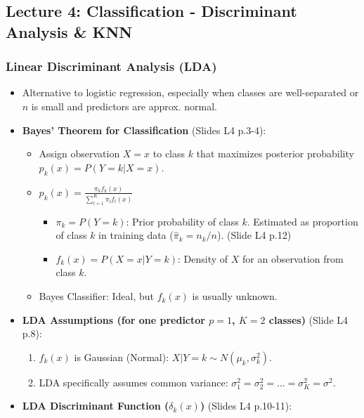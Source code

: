 \documentclass[12pt,a4paper]{article}
\begin{document}
\begin{itemize}
\subsection{Lecture 4: Classification - Discriminant Analysis \& KNN}
    \subsubsection{Linear Discriminant Analysis (LDA) }
        \begin{itemize}
            \item Alternative to logistic regression, especially when classes are well-separated or $n$ is small and predictors are approx. normal.
            \item \textbf{Bayes' Theorem for Classification} (Slides L4 p.3-4):
                \begin{itemize}
                    \item Assign observation $X=x$ to class $k$ that maximizes posterior probability $p_k(x) = P(Y=k|X=x)$.
                    \item $p_k(x) = \frac{\pi_k f_k(x)}{\sum_{l=1}^{K} \pi_l f_l(x)}$
                        \begin{itemize}
                            \item $\pi_k = P(Y=k)$: Prior probability of class $k$. Estimated as proportion of class $k$ in training data ($\hat{\pi}_k = n_k/n$). (Slide L4 p.12)
                            \item $f_k(x) = P(X=x|Y=k)$: Density of $X$ for an observation from class $k$.
                        \end{itemize}
                    \item Bayes Classifier: Ideal, but $f_k(x)$ is usually unknown.
                \end{itemize}
            \item \textbf{LDA Assumptions (for one predictor $p=1$, $K=2$ classes)} (Slide L4 p.8):
                \begin{enumerate}
                    \item $f_k(x)$ is Gaussian (Normal): $X|Y=k \sim N(\mu_k, \sigma_k^2)$.
                    \item LDA specifically assumes common variance: $\sigma_1^2 = \sigma_2^2 = \dots = \sigma_K^2 = \sigma^2$.
                \end{enumerate}
            \item \textbf{LDA Discriminant Function ($\delta_k(x)$)} (Slides L4 p.10-11):

\end{itemize}
\end{itemize}
\end{document}

